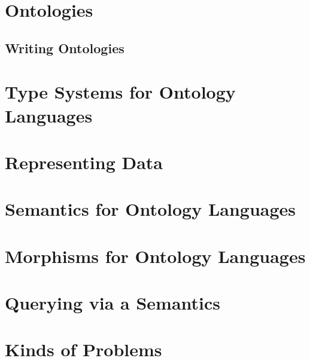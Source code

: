 \documentclass{book}
\begin{document}
\chapter{Ontologies}
 
 \section{Writing Ontologies}\label{sec:onto:write}
   

\chapter{Type Systems for Ontology Languages}\label{sec:onto:type}
   

\chapter{Representing Data}\label{sec:wuv:codecs}
  

\chapter{Semantics for Ontology Languages}\label{sec:bolsem}
 

\chapter{Morphisms for Ontology Languages}\label{sec:onto:morph}
   

\chapter{Querying via a Semantics}\label{sec:bolquery}
 

\chapter{Kinds of Problems}\label{sec:bolquery}


%
%
%
%
%
%
%



\end{document}
